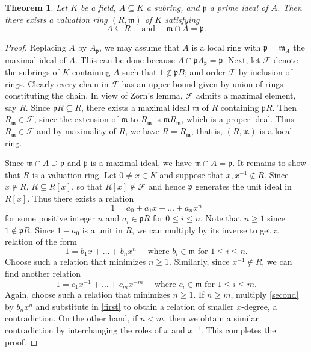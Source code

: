 \documentclass[11pt]{article}
\theoremstyle{thmstyle}
\newtheorem{theorem}{Theorem}[section]
\theoremstyle{defstyle}
\newcommand{\frakm}{\mathfrak{m}} %
\newcommand{\frakp}{\mathfrak{p}} %
\newcommand{\scrF}{\mathscr{F}}
\renewcommand{\le}{\leqslant}
\renewcommand{\ge}{\geqslant}
\begin{document}
\begin{theorem}
    Let $K$ be a field, $A\subseteq K$ a subring, and $\frakp$ a prime ideal of $A$. Then there exists a valuation ring $(R, \frakm)$ of $K$ satisfying 
    \begin{equation*}
        A\subseteq R\quad\text{ and }\quad \frakm\cap A = \frakp.
    \end{equation*}
\end{theorem}
\begin{proof}
    Replacing $A$ by $A_\frakp$, we may assume that $A$ is a local ring with $\frakp = \frakm_A$ the maximal ideal of $A$. This can be done because $A\cap\frakp A_\frakp = \frakp$. Next, let $\scrF$ denote the subrings of $K$ containing $A$ such that $1\notin\frakp B$; and order $\scrF$ by inclusion of rings. Clearly every chain in $\scrF$ has an upper bound given by union of rings constituting the chain. In view of Zorn's lemma, $\scrF$ admits a maximal element, say $R$. Since $\frakp R\subsetneq R$, there exists a maximal ideal $\frakm$ of $R$ containing $\frakp R$. Then $R_\frakm\in\scrF$, since the extension of $\frakm$ to $R_\frakm$ is $\frakm R_\frakm$, which is a proper ideal. Thus $R_\frakm\in\scrF$ and by maximality of $R$, we have $R = R_\frakm$, that is, $(R,\frakm)$ is a local ring. 

    Since $\frakm\cap A\supseteq\frakp$ and $\frakp$ is a maximal ideal, we have $\frakm\cap A = \frakp$. It remains to show that $R$ is a valuation ring. Let $0\ne x\in K$ and suppose that $x, x^{-1}\notin R$. Since $x\notin R$, $R\subsetneq R[x]$, so that $R[x]\notin\scrF$ and hence $\frakp$ generates the unit ideal in $R[x]$. Thus there exists a relation 
    \begin{equation*}
        1 = a_0 + a_1x + \dots + a_nx^n 
    \end{equation*}
    for some positive integer $n$ and $a_i\in\frakp R$ for $0\le i\le n$. Note that $n\ge 1$ since $1\notin\frakp R$. Since $1 - a_0$ is a unit in $R$, we can multiply by its inverse to get a relation of the form 
    \begin{equation}
        1 = b_1x + \dots + b_nx^n\quad\text{ where }b_i\in\frakm\text{ for }1\le i\le n.\label{first}\tag{$\star$}
    \end{equation}
    Choose such a relation that minimizes $n\ge 1$. Similarly, since $x^{-1}\notin R$, we can find another relation 
    \begin{equation}
        1 = c_1x^{-1} + \dots + c_mx^{-m}\quad\text{ where }c_i\in\frakm\text{ for }1\le i\le m.\label{second}\tag{$\star\star$}
    \end{equation}
    Again, choose such a relation that minimizes $n\ge 1$. If $n\ge m$, multiply \eqref{second} by $b_nx^n$ and substitute in \eqref{first} to obtain a relation of smaller $x$-degree, a contradiction. On the other hand, if $n < m$, then we obtain a similar contradiction by interchanging the roles of $x$ and $x^{-1}$. This completes the proof.
\end{proof}
\end{document}
